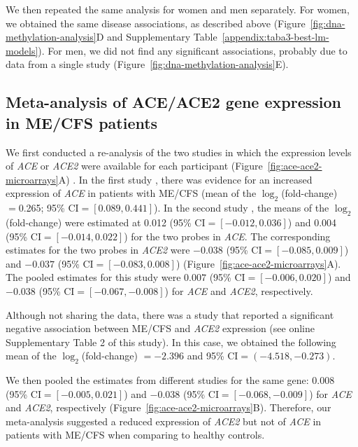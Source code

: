 We then repeated the same analysis for women and men separately. For women, we obtained the same disease associations, as described above (Figure~\ref{fig:dna-methylation-analysis}D and Supplementary Table~\ref{appendix:taba3-best-lm-models}). For men, we did not find any significant associations, probably due to data from a single study \citep{herrera2018GenomeepigenomeInteractions} (Figure~\ref{fig:dna-methylation-analysis}E).

\subsection{Meta-analysis of ACE/ACE2 gene expression in ME/CFS patients}

We first conducted a re-analysis of the two studies in which the expression levels of \textit{ACE} or \textit{ACE2} were available for each participant (Figure~\ref{fig:ace-ace2-microarrays}A) \citep{saikiIdentificationMarkerGenes2008, gowGeneSignaturePostinfectious2009}. In the first study \citep{saikiIdentificationMarkerGenes2008}, there was evidence for an increased expression of \textit{ACE} in patients with ME/CFS (mean of the {$\log_{2}$}(fold-change) $= 0.$265; 95\% $\text{CI} = [0.089, 0.441]$). In the second study \citep{gowGeneSignaturePostinfectious2009}, the means of the {$\log_{2}$}(fold-change) were estimated at 0.012 (95\% $\text{CI} = [-0.012, 0.036]$) and 0.004 (95\% $\text{CI} = [-0.014, 0.022]$) for the two probes in \textit{ACE}. The corresponding estimates for the two probes in \textit{ACE2} were $-0.038$ (95\% $\text{CI}=[-0.085, 0.009]$) and $-0.037$ (95\% $\text{CI}=[-0.083, 0.008]$) (Figure~\ref{fig:ace-ace2-microarrays}A). The pooled estimates for this study were $0.007$ (95\% $\text{CI}=[-0.006, 0.020]$) and $-0.038$ (95\% $\text{CI}=[-0.067, -0.008]$) for \textit{ACE} and \textit{ACE2}, respectively.

Although not sharing the data, there was a study \citep{smithConvergentGenomicStudies2011} that reported a significant negative association between ME/CFS and \textit{ACE2} expression (see online Supplementary Table 2 of this study). In this case, we obtained the following mean of the {$\log_{2}$}(fold-change) $= -2.396$ and 95\% $\text{CI} = (-4.518, -0.273)$.

We then pooled the estimates from different studies for the same gene: $0.008$ (95\% $\text{CI}=[-0.005, 0.021]$) and $-0.038$ (95\% $\text{CI} = [-0.068, -0.009]$) for \textit{ACE} and \textit{ACE2}, respectively (Figure~\ref{fig:ace-ace2-microarrays}B). Therefore, our meta-analysis suggested a reduced expression of \textit{ACE2} but not of \textit{ACE} in patients with ME/CFS when comparing to healthy controls.

